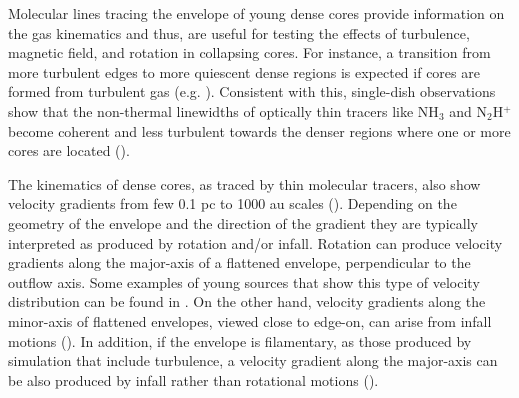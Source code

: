 \documentclass[iop]{emulateapj}
\begin{document}
Molecular lines tracing the envelope of young dense cores provide information on the gas kinematics and thus, are useful for testing the effects of turbulence, magnetic field, and rotation in collapsing cores. For instance, a transition from more turbulent edges to more quiescent dense regions is expected if cores are formed from turbulent gas (e.g. \citealt{2008OffnerKinematics}). Consistent with this, single-dish observations show that the non-thermal linewidths of optically thin tracers like NH$_3$ and N$_2$H$^{+}$ become coherent and less turbulent towards the denser regions where one or more cores are located (\citealt{1998GoodmanCoherence,2010PinedaDirect,2011HacarDense,2015SeoAmmonia,2017FriesenGreen}).

The kinematics of dense cores, as traced by thin molecular tracers, also show velocity gradients from few 0.1 pc to 1000 au scales (\citealt{1993GoodmanDense,2002CaselliDense,2007ChenOvro,2011TobinComplex,2011PinedaEnigmatic}). Depending on the geometry of the envelope and the direction of the gradient they are typically interpreted as produced by rotation and/or infall. Rotation can produce velocity gradients along the major-axis of a flattened envelope, perpendicular to the outflow axis. Some examples of young sources that show this type of velocity distribution can be found in \cite{2002BellochMolecular,2011TobinComplex,2011TannerDynamics,2013YenUnveiling,2016OyaInfalling,2017MaureiraKinematics}. On the other hand, velocity gradients along the minor-axis of flattened envelopes, viewed close to edge-on, can arise from infall motions (\citealt{1995TorrellesSignatures,1999OhashiCCS,2002CaselliMolecular,2010YenHigh}). In addition, if the envelope is filamentary, as those produced by simulation that include turbulence,  a velocity gradient along the major-axis can be also produced by infall rather than rotational motions (\citealt{2012TobinComplexIII}).\\
\end{document}
